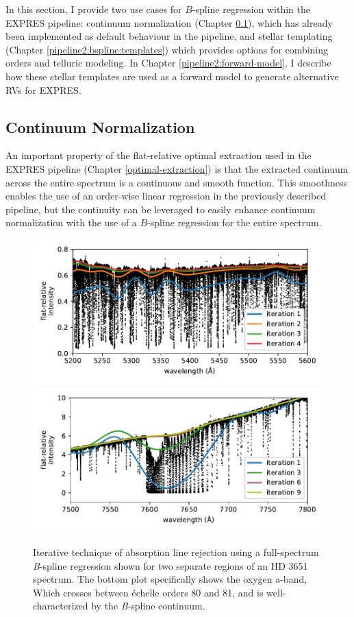 In this section, I provide two use cases for $B$-spline regression within the EXPRES pipeline: continuum normalization (Chapter \ref{pipeline2:bspline:cont-norm}), which has already been implemented as default behaviour in the pipeline, and stellar templating (Chapter \ref{pipeline2:bspline:templates}) which provides options for combining orders and telluric modeling. In Chapter \ref{pipeline2:forward-model}, I describe how these stellar templates are used as a forward model to generate alternative RVs for EXPRES.

\subsection{Continuum Normalization} \label{pipeline2:bspline:cont-norm}

An important property of the flat-relative optimal extraction used in the EXPRES pipeline (Chapter \ref{optimal-extraction}) is that the extracted continuum across the entire spectrum is a continuous and smooth function. This smoothness enables the use of an order-wise linear regression in the previously described pipeline, but the continuity can be leveraged to easily enhance continuum normalization with the use of a $B$-spline regression for the entire spectrum.

\begin{figure}
    \centering
    \includegraphics[width=\textwidth]{figures-5/cont-norm-bspline.pdf}
    \includegraphics[width=\textwidth]{figures-5/cont-norm-bspline-oxygen.pdf}
    \caption{Iterative technique of absorption line rejection using a full-spectrum \textit{B}-spline regression shown for two separate regions of an HD 3651 spectrum. The bottom plot specifically shows the oxygen a-band, Which crosses between \'echelle orders 80 and 81, and is well-characterized by the \textit{B}-spline continuum.}
    \label{fig:cont-norm-bspline}
\end{figure}

